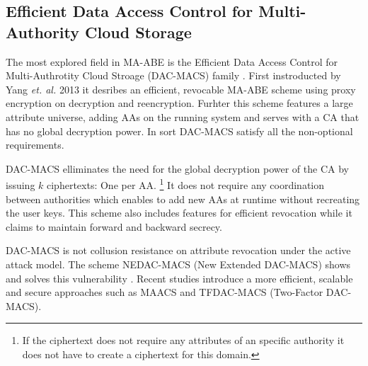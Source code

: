 \subsection{Efficient Data Access Control for Multi-Authority Cloud Storage}
The most explored field in MA-ABE is the Efficient Data Access Control for Multi-Authrotity Cloud Stroage (DAC-MACS) family \cite{yang2013dac}. First instroducted by Yang \textit{et. al.} 2013 it desribes an efficient, revocable MA-ABE scheme using proxy encryption on decryption and reencryption. Furhter this scheme features a large attribute universe, adding AAs on the running system and serves with a CA that has no global decryption power. In sort DAC-MACS satisfy all the non-optional requirements.

DAC-MACS elliminates the need for the global decryption power of the CA by issuing $k$ ciphertexts: One per AA. \footnote{If the ciphertext does not require any attributes of an specific authority it does not have to create a ciphertext for this domain.} It does not require any coordination between authorities which enables to add new AAs at runtime without recreating the user keys. This scheme also includes features for efficient revocation while it claims to maintain forward and backward secrecy.

DAC-MACS is not collusion resistance on attribute revocation under the active attack model. The scheme NEDAC-MACS (New Extended DAC-MACS) shows and solves this vulnerability \cite{wu2017security}. Recent studies introduce a more efficient, scalable and secure approaches such as MAACS \cite{li2016secure} and TFDAC-MACS (Two-Factor DAC-MACS)\cite{li2017two}.
